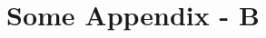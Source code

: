 \documentclass[../../main.tex]{subfiles}
\begin{document}
\section{Some Appendix - B}
\thispagestyle{fancy}

\blindtext %
\end{document}
